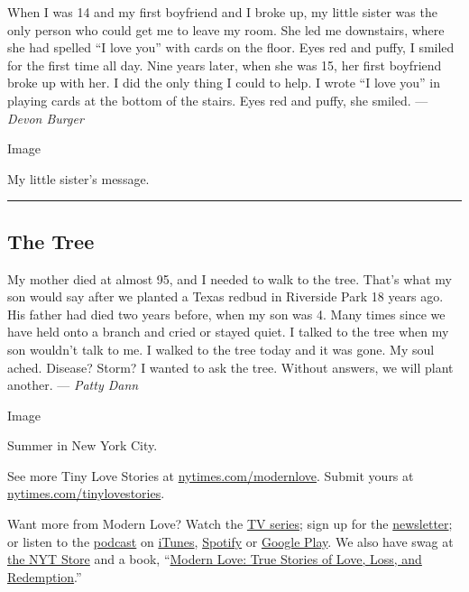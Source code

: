 When I was 14 and my first boyfriend and I broke up, my little sister
was the only person who could get me to leave my room. She led me
downstairs, where she had spelled ``I love you'' with cards on the
floor. Eyes red and puffy, I smiled for the first time all day. Nine
years later, when she was 15, her first boyfriend broke up with her. I
did the only thing I could to help. I wrote ``I love you'' in playing
cards at the bottom of the stairs. Eyes red and puffy, she smiled. ---
\emph{Devon Burger}

Image

My little sister's message.

\begin{center}\rule{0.5\linewidth}{\linethickness}\end{center}

\hypertarget{the-tree}{%
\subsection{The Tree}\label{the-tree}}

My mother died at almost 95, and I needed to walk to the tree. That's
what my son would say after we planted a Texas redbud in Riverside Park
18 years ago. His father had died two years before, when my son was 4.
Many times since we have held onto a branch and cried or stayed quiet. I
talked to the tree when my son wouldn't talk to me. I walked to the tree
today and it was gone. My soul ached. Disease? Storm? I wanted to ask
the tree. Without answers, we will plant another. --- \emph{Patty Dann}

Image

Summer in New York City.

See more Tiny Love Stories at
\href{https://www.nytimes.com/column/modern-love}{nytimes.com/modernlove}.
Submit yours at
\href{http://nytimes.com/tinylovestories}{nytimes.com/tinylovestories}.

Want more from Modern Love? Watch the
\href{https://www.nytimes.com/2019/09/12/style/modern-love-tv-show-trailer.html}{TV
series}; sign up for the
\href{https://www.nytimes.com/newsletters/love-letter}{newsletter}; or
listen to the
\href{https://www.nytimes.com/column/modern-love-podcast}{podcast} on
\href{https://itunes.apple.com/us/podcast/modern-love/id1065559535?mt=2\&version=meter+at+0\&module=meter-Links\&pgtype=article\&contentId=\&mediaId=\&referrer=\&priority=true\&action=click\&contentCollection=meter-links-click}{iTunes},
\href{https://open.spotify.com/show/03Er7mSPq9IEewOgbPD3vO}{Spotify} or
\href{https://play.google.com/music/listen?u=0\#/ps/Iktqjbkz7bychbnofblw32dik64}{Google
Play}. We also have swag at
\href{https://store.nytimes.com/collections/modern-love}{the NYT Store}
and a book,
``\href{https://www.penguinrandomhouse.com/books/623036/modern-love-revised-and-updated-by-edited-by-daniel-jones-with-contributions-by-andrew-rannells-ayelet-waldman-amy-krouse-rosenthal-veronica-chambers-and-more/}{Modern
Love: True Stories of Love, Loss, and Redemption}.''

